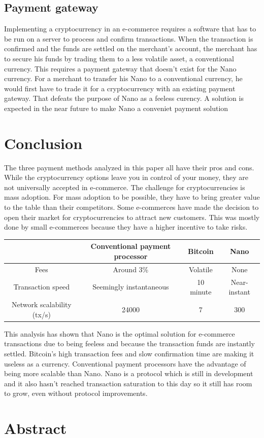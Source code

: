 \documentclass{ferseminar}
\begin{document}
\subsection{Payment gateway}
Implementing a cryptocurrency in an e-commerce requires a software that has to be run on a server to process and confirm transactions. When the transaction is confirmed and the funds are settled on the merchant's account, the merchant has to secure his funds by trading them to a less volatile asset, a conventional currency. This requires a payment gateway that doesn't exist for the Nano currency. For a merchant to transfer his Nano to a conventional currency, he would first have to trade it for a cryptocurrency with an existing payment gateway. That defeats the purpose of Nano as a feeless curency. A solution is expected in the near future to make Nano a conveniet payment solution 

\section{Conclusion}
The three payment methods analyzed in this paper all have their pros and cons. While the cryptocurrency options leave you in control of your money, they are not universally accepted in e-commerce. The challenge for cryptocurrencies is mass adoption. For mass adoption to be possible, they have to bring greater value to the table than their competitors. Some e-commerces have made the decision to open their market for cryptocurrencies to attract new customers. This was mostly done by small e-commerces because they have a higher incentive to take risks. 


\begin{center}
	\begin{tabular}{ |c||c|c|c| }
		\hline
		& Conventional payment processor & Bitcoin & Nano\\ 
		\hline\hline
		Fees & Around 3\% & Volatile & None\\  
		\hline
		Transaction speed & Seemingly instantaneous & 10 minute & Near-instant\\
		\hline
		Network scalability (tx/s) & 24000 & 7 & 300\\
		\hline
	\end{tabular}
\end{center}

This analysis has shown that Nano is the optimal solution for e-commerce transactions due to being feeless and because the transaction funds are instantly settled. Bitcoin's high transaction fees and slow confirmation time are making it useless as a currency. Conventional payment processors have the advantage of being more scalable than Nano. Nano is a protocol which is still in development and it also hasn't reached transaction saturation to this day so it still has room to grow, even without protocol improvements. 
\section{Abstract}
\end{document}
